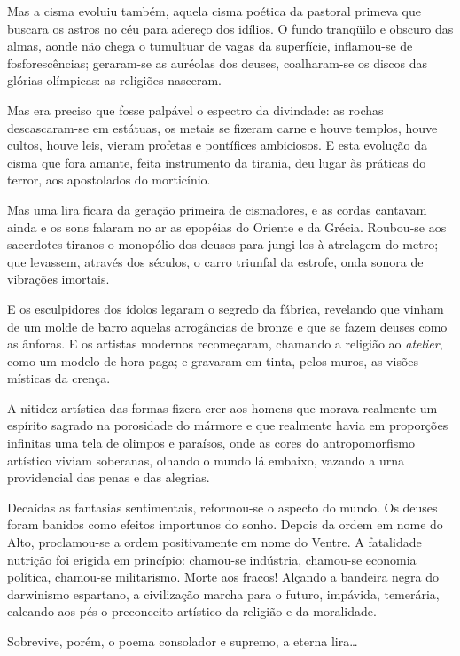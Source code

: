 Mas a cisma evoluiu também, aquela cisma
poética da pastoral primeva que buscara os astros no céu para adereço
dos idílios. O fundo tranqüilo e obscuro das almas, aonde não chega o
tumultuar de vagas da superfície, inflamou{}-se de fosforescências;
geraram{}-se as auréolas dos deuses, coalharam{}-se os discos das
glórias olímpicas: as religiões nasceram. 

Mas era preciso que fosse
palpável o espectro da divindade: as rochas descascaram{}-se em
estátuas, os metais se fizeram carne e houve templos, houve cultos,
houve leis, vieram profetas e pontífices ambiciosos. E esta evolução da
cisma que fora amante, feita instrumento da tirania, deu lugar às
práticas do terror, aos apostolados do morticínio. 

Mas uma lira ficara
da geração primeira de cismadores, e as cordas cantavam ainda e os sons
falaram no ar as epopéias do Oriente e da Grécia. Roubou{}-se aos
sacerdotes tiranos o monopólio dos deuses para jungi{}-los à atrelagem
do metro; que levassem, através dos séculos, o carro triunfal da
estrofe, onda sonora de vibrações imortais. 

E os esculpidores dos
ídolos legaram o segredo da fábrica, revelando que vinham de um molde
de barro aquelas arrogâncias de bronze e que se fazem deuses como as
ânforas. E os artistas modernos recomeçaram, chamando a religião ao
\textit{atelier}, como um modelo de hora paga; e gravaram em tinta, pelos muros,
as visões místicas da crença. 

A nitidez artística das formas fizera
crer aos homens que morava realmente um espírito sagrado na porosidade
do mármore e que realmente havia em proporções infinitas uma tela de
olimpos e paraísos, onde as cores do antropomorfismo artístico viviam
soberanas, olhando o mundo lá embaixo, vazando a urna providencial das
penas e das alegrias. 

Decaídas as fantasias sentimentais, reformou{}-se
o aspecto do mundo. Os deuses foram banidos como efeitos importunos do
sonho. Depois da ordem em nome do Alto, proclamou{}-se a ordem
positivamente em nome do Ventre. A fatalidade nutrição foi erigida em
princípio: chamou{}-se indústria, chamou{}-se economia política,
chamou{}-se militarismo. Morte aos fracos! Alçando a bandeira negra do
darwinismo espartano, a civilização marcha para o futuro, impávida,
temerária, calcando aos pés o preconceito artístico da religião e da
moralidade. 

Sobrevive, porém, o poema consolador e supremo, a eterna
lira\ldots 

